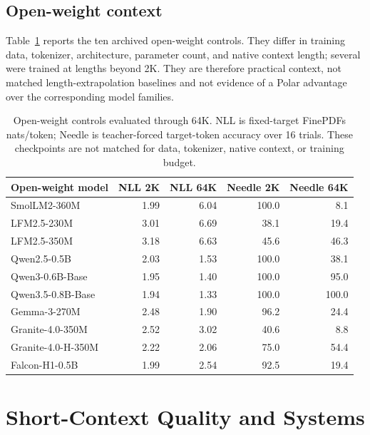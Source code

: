 \subsection{Open-weight context}
Table~\ref{table:open_weight_controls} reports the ten archived open-weight controls. They differ in training data, tokenizer, architecture, parameter count, and native context length; several were trained at lengths beyond 2K. They are therefore practical context, not matched length-extrapolation baselines and not evidence of a Polar advantage over the corresponding model families.

\begin{table}[h]
\centering
\scriptsize
\setlength{\tabcolsep}{3.4pt}
\begin{tabular}{lrrrr}
\toprule
\textbf{Open-weight model} & \textbf{NLL 2K} & \textbf{NLL 64K} & \textbf{Needle 2K} & \textbf{Needle 64K} \\
\midrule
SmolLM2-360M & 1.99 & 6.04 & 100.0 & 8.1 \\
LFM2.5-230M & 3.01 & 6.69 & 38.1 & 19.4 \\
LFM2.5-350M & 3.18 & 6.63 & 45.6 & 46.3 \\
Qwen2.5-0.5B & 2.03 & 1.53 & 100.0 & 38.1 \\
Qwen3-0.6B-Base & 1.95 & 1.40 & 100.0 & 95.0 \\
Qwen3.5-0.8B-Base & 1.94 & 1.33 & 100.0 & 100.0 \\
Gemma-3-270M & 2.48 & 1.90 & 96.2 & 24.4 \\
Granite-4.0-350M & 2.52 & 3.02 & 40.6 & 8.8 \\
Granite-4.0-H-350M & 2.22 & 2.06 & 75.0 & 54.4 \\
Falcon-H1-0.5B & 1.99 & 2.54 & 92.5 & 19.4 \\
\bottomrule
\end{tabular}
\caption{Open-weight controls evaluated through 64K. NLL is fixed-target FinePDFs nats/token; Needle is teacher-forced target-token accuracy over 16 trials. These checkpoints are not matched for data, tokenizer, native context, or training budget.}
\label{table:open_weight_controls}
\end{table}

\section{Short-Context Quality and Systems}
\label{appendix:quality}

